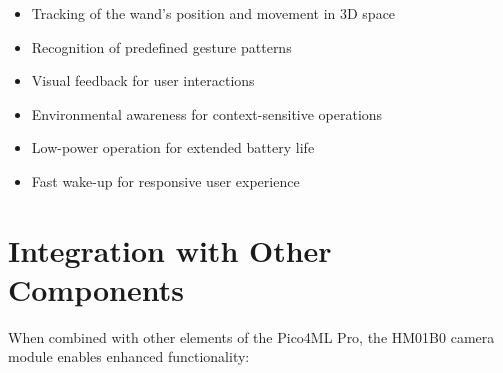 \begin{itemize}
    
    
    
    \item Tracking of the wand's position and movement in 3D space
    
    
    
    \item Recognition of predefined gesture patterns
    
    
    
    \item Visual feedback for user interactions
    
    
    
    \item Environmental awareness for context-sensitive operations
    
    
    
    \item Low-power operation for extended battery life
    
    
    
    \item Fast wake-up for responsive user experience
    
    
    
\end{itemize}







\section{Integration with Other Components}



When combined with other elements of the Pico4ML Pro, the HM01B0 camera module enables enhanced functionality:



